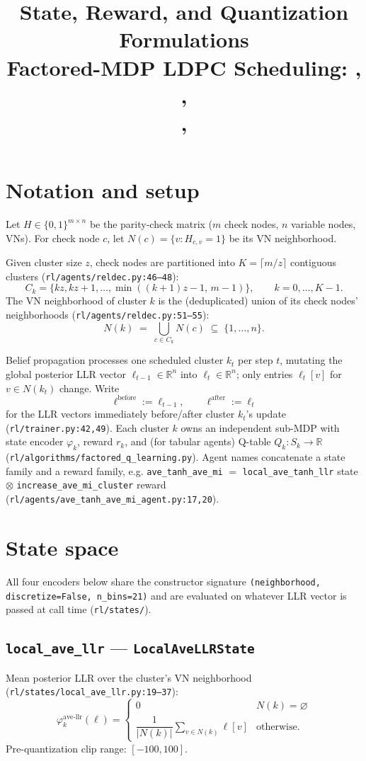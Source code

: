 \documentclass[11pt]{article}
\title{State, Reward, and Quantization Formulations\\
\large Factored-MDP LDPC Scheduling: \code{local\_ave\_*}, \code{local\_tanh\_*},\\
\code{ave\_cluster\_residue}, \code{increase\_ave\_mi\_cluster}}
\author{}
\date{}
\newcommand{\code}[1]{\texttt{#1}}
\newcommand{\file}[1]{\texttt{#1}}
\begin{document}
\maketitle

\section{Notation and setup}

Let $H \in \{0,1\}^{m \times n}$ be the parity-check matrix ($m$ check nodes, $n$ variable
nodes, VNs). For check node $c$, let $N(c) = \{v : H_{c,v} = 1\}$ be its VN neighborhood.

Given cluster size $z$, check nodes are partitioned into $K = \lceil m/z \rceil$
contiguous clusters (\file{rl/agents/reldec.py:46--48}):
\[
C_k = \{kz, kz+1, \dots, \min((k+1)z-1,\, m-1)\}, \qquad k = 0,\dots,K-1.
\]
The VN neighborhood of cluster $k$ is the (deduplicated) union of its check nodes'
neighborhoods (\file{rl/agents/reldec.py:51--55}):
\[
N(k) \;=\; \bigcup_{c \in C_k} N(c) \;\subseteq\; \{1,\dots,n\}.
\]

Belief propagation processes one scheduled cluster $k_t$ per step $t$, mutating the
global posterior LLR vector $\ell_{t-1}\in\mathbb{R}^n$ into $\ell_t\in\mathbb{R}^n$;
only entries $\ell_t[v]$ for $v\in N(k_t)$ change. Write
\[
\ell^{\mathrm{before}} := \ell_{t-1}, \qquad \ell^{\mathrm{after}} := \ell_t
\]
for the LLR vectors immediately before/after cluster $k_t$'s update
(\file{rl/trainer.py:42,49}). Each cluster $k$ owns an independent sub-MDP with state
encoder $\varphi_k$, reward $r_k$, and (for tabular agents) Q-table
$Q_k : S_k \to \mathbb{R}$ (\file{rl/algorithms/factored\_q\_learning.py}). Agent names
concatenate a state family and a reward family, e.g. \code{ave\_tanh\_ave\_mi} $=$
\code{local\_ave\_tanh\_llr} state $\otimes$ \code{increase\_ave\_mi\_cluster} reward
(\file{rl/agents/ave\_tanh\_ave\_mi\_agent.py:17,20}).

\section{State space}

All four encoders below share the constructor signature
\code{(neighborhood, discretize=False, n\_bins=21)} and are evaluated on whatever LLR
vector is passed at call time (\file{rl/states/}).

\subsection{\code{local\_ave\_llr} --- \code{LocalAveLLRState}}
\label{sec:ave-llr}
Mean posterior LLR over the cluster's VN neighborhood
(\file{rl/states/local\_ave\_llr.py:19--37}):
\[
\varphi_k^{\mathrm{ave\text{-}llr}}(\ell) =
\begin{cases}
0 & N(k) = \varnothing \\[2pt]
\dfrac{1}{|N(k)|}\displaystyle\sum_{v\in N(k)} \ell[v] & \text{otherwise.}
\end{cases}
\]
Pre-quantization clip range: $[-100, 100]$.
\end{document}
